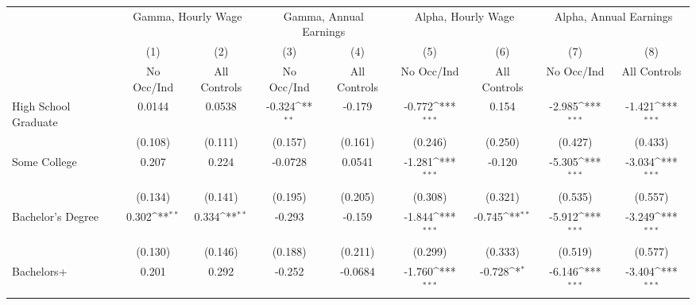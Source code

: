 {
\def\sym#1{\ifmmode^{#1}\else\(^{#1}\)\fi}
\begin{tabular}{l*{4}{c}|*{4}{c}}
\hline\hline
                    &\multicolumn{2}{c}{Gamma, Hourly Wage}     &\multicolumn{2}{c}{Gamma, Annual Earnings} &\multicolumn{2}{c}{Alpha, Hourly Wage}     &\multicolumn{2}{c}{Alpha, Annual Earnings} \\
                    &\multicolumn{1}{c}{(1)}&\multicolumn{1}{c}{(2)}&\multicolumn{1}{c}{(3)}&\multicolumn{1}{c}{(4)}&\multicolumn{1}{c}{(5)}&\multicolumn{1}{c}{(6)}&\multicolumn{1}{c}{(7)}&\multicolumn{1}{c}{(8)}\\
                    &\multicolumn{1}{c}{No Occ/Ind}&\multicolumn{1}{c}{All Controls}&\multicolumn{1}{c}{No Occ/Ind}&\multicolumn{1}{c}{All Controls}&\multicolumn{1}{c}{No Occ/Ind}&\multicolumn{1}{c}{All Controls}&\multicolumn{1}{c}{No Occ/Ind}&\multicolumn{1}{c}{All Controls}\\
\hline
High School Graduate&      0.0144         &      0.0538         &      -0.324\sym{**} &      -0.179         &      -0.772\sym{***}&       0.154         &      -2.985\sym{***}&      -1.421\sym{***}\\
                    &     (0.108)         &     (0.111)         &     (0.157)         &     (0.161)         &     (0.246)         &     (0.250)         &     (0.427)         &     (0.433)         \\
[1em]
Some College        &       0.207         &       0.224         &     -0.0728         &      0.0541         &      -1.281\sym{***}&      -0.120         &      -5.305\sym{***}&      -3.034\sym{***}\\
                    &     (0.134)         &     (0.141)         &     (0.195)         &     (0.205)         &     (0.308)         &     (0.321)         &     (0.535)         &     (0.557)         \\
[1em]
Bachelor's Degree   &       0.302\sym{**} &       0.334\sym{**} &      -0.293         &      -0.159         &      -1.844\sym{***}&      -0.745\sym{**} &      -5.912\sym{***}&      -3.249\sym{***}\\
                    &     (0.130)         &     (0.146)         &     (0.188)         &     (0.211)         &     (0.299)         &     (0.333)         &     (0.519)         &     (0.577)         \\
[1em]
Bachelors+          &       0.201         &       0.292         &      -0.252         &     -0.0684         &      -1.760\sym{***}&      -0.728\sym{*}  &      -6.146\sym{***}&      -3.404\sym{***}\\

\end{tabular}}
